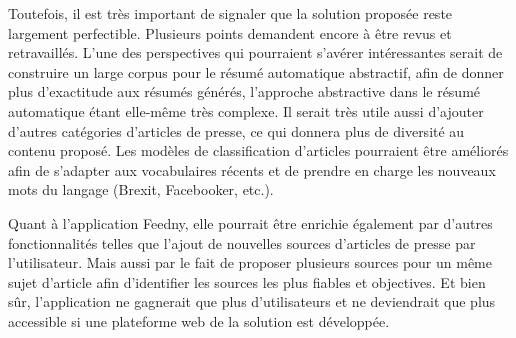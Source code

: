 Toutefois, il est très important de signaler que la solution proposée reste largement perfectible. Plusieurs points demandent encore à être revus et retravaillés. L'une des perspectives qui pourraient s'avérer intéressantes serait de construire un large corpus pour le résumé automatique abstractif, afin de donner plus d'exactitude aux résumés générés, l'approche abstractive dans le résumé automatique étant elle-même très complexe. Il serait très utile aussi d'ajouter d'autres catégories d'articles de presse, ce qui donnera plus de diversité au contenu proposé. Les modèles de classification d'articles pourraient être améliorés afin de s'adapter aux vocabulaires récents et de prendre en charge les nouveaux mots du langage (Brexit, Facebooker, etc.).

Quant à l'application \textquotedbl Feedny\textquotedbl, elle pourrait être enrichie également par d'autres fonctionnalités telles que l'ajout de nouvelles sources d'articles de presse par l'utilisateur. Mais aussi par le fait de proposer plusieurs sources pour un même sujet d'article afin d'identifier les sources les plus fiables et objectives.
Et bien sûr, l'application ne gagnerait que plus d'utilisateurs et ne deviendrait que plus accessible si une plateforme web de la solution est développée.